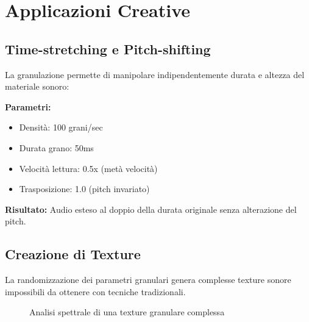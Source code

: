 \documentclass[a4paper,11pt,openany]{book}
\begin{document}
\section{Applicazioni Creative}

\subsection{Time-stretching e Pitch-shifting}

La granulazione permette di manipolare indipendentemente durata e altezza del materiale sonoro:

\textbf{Parametri:}
\begin{itemize}
    \item Densità: 100 grani/sec
    \item Durata grano: 50ms
    \item Velocità lettura: 0.5x (metà velocità)
    \item Trasposizione: 1.0 (pitch invariato)
\end{itemize}
\textbf{Risultato:} Audio esteso al doppio della durata originale senza alterazione del pitch.

\subsection{Creazione di Texture}

La randomizzazione dei parametri granulari genera complesse texture sonore impossibili da ottenere con tecniche tradizionali.

\begin{figure}[H]
    \centering
    \caption{Analisi spettrale di una texture granulare complessa}
    \label{fig:granular_texture}
\end{figure}
\end{document}
